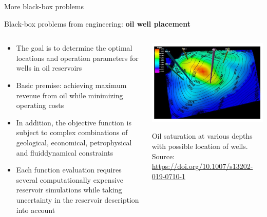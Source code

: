 \documentclass[11pt,compress,t,notes=noshow, xcolor=table]{beamer}
\begin{document}
\begin{vbframe}{More black-box problems}

Black-box problems from engineering: \textbf{oil well placement}
\vspace*{-0.1cm}
\begin{columns}
	\begin{column}{0.65\textwidth}
		\begin{itemize}
			\item The goal is to determine the optimal locations and operation parameters for wells in oil reservoirs
			\item Basic premise: achieving maximum revenue from oil while minimizing operating costs
			\item In addition, the objective function is subject to complex combinations of geological, economical, petrophysical and fluiddynamical constraints 
			\item Each function evaluation requires several computationally expensive reservoir simulations while taking uncertainty in the reservoir description into account 
		\end{itemize}
	\end{column}
	\begin{column}{0.35\textwidth}
		\begin{center}
			\includegraphics{figure_man/oil_well_problem.jpg}
			\begin{footnotesize}
				Oil saturation at various depths with possible location of wells.
				\newline
				\tiny{Source: \url{https://doi.org/10.1007/s13202-019-0710-1}}
			\end{footnotesize}
		\end{center}
	\end{column}
\end{columns}

\end{vbframe}
	


\endlecture
\end{document}
